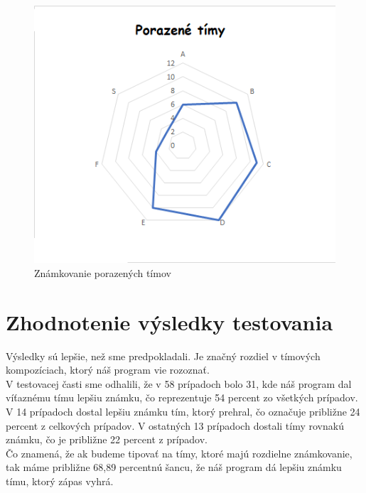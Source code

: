 \begin{figure}[h!]
	
	\includegraphics[width=.9\textwidth]{figures/lose}
	\centering
	\caption{ Známkovanie porazených tímov \label{lose}}
	
\end{figure}

\section{Zhodnotenie výsledky testovania}
Výsledky sú lepšie, než sme predpokladali. Je značný rozdiel v tímových kompozíciach, ktorý náš program vie rozoznať.
\\
V testovacej časti sme odhalili, že v 58 prípadoch bolo 31, kde náš program dal víťaznému tímu lepšiu známku, čo reprezentuje 54 percent zo všetkých prípadov.
V 14 prípadoch dostal lepšiu známku tím, ktorý prehral, čo označuje približne 24 percent z celkových prípadov.
V ostatných 13 prípadoch dostali tímy rovnakú známku, čo je približne 22 percent z prípadov.
\\ 
Čo znamená, že ak budeme tipovať na tímy, ktoré majú rozdielne známkovanie, tak máme približne 68,89 percentnú šancu, že náš program dá lepšiu známku tímu, ktorý zápas vyhrá.
